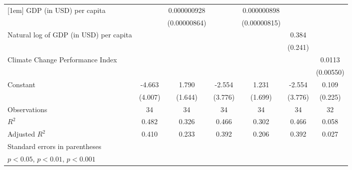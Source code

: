 {\begin{tabular}{l*{6}{c}}
[1em]
GDP (in USD) per capita&                     & 0.000000928         &                     & 0.000000898         &                     &                     \\
                    &                     &(0.00000864)         &                     &(0.00000815)         &                     &                     \\
[1em]
Natural log of GDP (in USD) per capita&                     &                     &                     &                     &       0.384         &                     \\
                    &                     &                     &                     &                     &     (0.241)         &                     \\
[1em]
Climate Change Performance Index&                     &                     &                     &                     &                     &      0.0113         \\
                    &                     &                     &                     &                     &                     &   (0.00550)         \\
[1em]
Constant            &      -4.663         &       1.790         &      -2.554         &       1.231         &      -2.554         &       0.109         \\
                    &     (4.007)         &     (1.644)         &     (3.776)         &     (1.699)         &     (3.776)         &     (0.225)         \\
\hline
Observations        &          34         &          34         &          34         &          34         &          34         &          32         \\
\(R^{2}\)           &       0.482         &       0.326         &       0.466         &       0.302         &       0.466         &       0.058         \\
Adjusted \(R^{2}\)  &       0.410         &       0.233         &       0.392         &       0.206         &       0.392         &       0.027         \\
\hline\hline
\multicolumn{7}{l}{\footnotesize Standard errors in parentheses}\\
\multicolumn{7}{l}{\footnotesize \sym{*} \(p<0.05\), \sym{**} \(p<0.01\), \sym{***} \(p<0.001\)}\\
\end{tabular}
}
